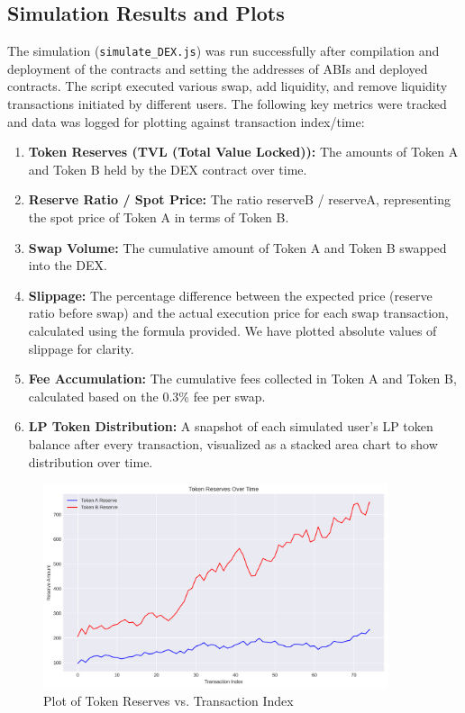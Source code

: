 \documentclass[12pt]{article}
\begin{document}
\subsection{Simulation Results and Plots}
The simulation (\texttt{simulate\_DEX.js}) was run successfully after compilation and deployment of the contracts and setting the addresses of ABIs and deployed contracts. The script executed various swap, add liquidity, and remove liquidity transactions initiated by different users.
The following key metrics were tracked and data was logged for plotting against transaction index/time:
\begin{enumerate}
    \item \textbf{Token Reserves (TVL (Total Value Locked)):} The amounts of Token A and Token B held by the DEX contract over time.
    \item \textbf{Reserve Ratio / Spot Price:} The ratio reserveB / reserveA, representing the spot price of Token A in terms of Token B.
    \item \textbf{Swap Volume:} The cumulative amount of Token A and Token B swapped into the DEX.
    \item \textbf{Slippage:} The percentage difference between the expected price (reserve ratio before swap) and the actual execution price for each swap transaction, calculated using the formula provided. We have plotted absolute values of slippage for clarity.
    \item \textbf{Fee Accumulation:} The cumulative fees collected in Token A and Token B, calculated based on the 0.3\% fee per swap.
    \item \textbf{LP Token Distribution:} A snapshot of each simulated user's LP token balance after every transaction, visualized as a stacked area chart to show distribution over time.
\end{enumerate}
\begin{figure}[H]
    \centering
    \includegraphics[width=0.9\textwidth]{../task2_plots/reserves.png}
    \caption{Plot of Token Reserves vs. Transaction Index}
    \label{fig:reserves}
\end{figure}
\end{document}

